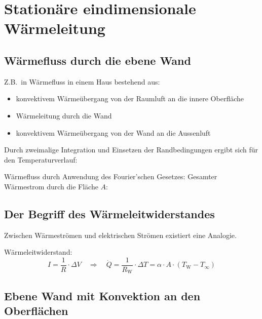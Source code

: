
\section{Stationäre eindimensionale Wärmeleitung} %
	\subsection{Wärmefluss durch die ebene Wand} %
		Z.B.~in Wärmefluss in einem Haus bestehend aus:
		\begin{itemize}
			\item konvektivem Wärmeübergang von der Raumluft an die innere Oberfläche
			\item Wärmeleitung durch die Wand
			\item konvektivem Wärmeübergang von der Wand an die Aussenluft
		\end{itemize}

		Durch zweimalige Integration und Einsetzen der Randbedingungen ergibt sich für den Temperaturverlauf:
		
		Wärmefluss durch Anwendung des Fourier'schen Gesetzes:
		Gesamter Wärmestrom durch die Fläche $A$:
	\subsection{Der Begriff des Wärmeleitwiderstandes} %
		Zwischen Wärmeströmen und elektrischen Strömen existiert eine Analogie.
		
		Wärmeleitwiderstand:
		\[
			I = \frac{1}{R} \cdot \Delta V \quad \Rightarrow \quad \dot Q = \frac{1}{R_\text{W}} \cdot \Delta T = \alpha \cdot A \cdot (T_\text{W} - T_\infty)
		\]
	\subsection{Ebene Wand mit Konvektion an den Oberflächen} %
